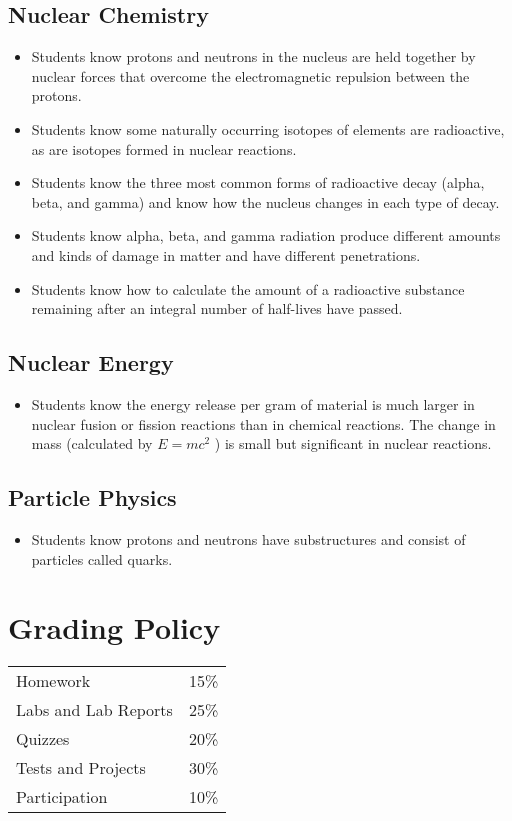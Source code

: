 \documentclass[12pt]{article}
\begin{document}
\subsection{Nuclear Chemistry}

\begin{itemize}
    \item Students know protons and neutrons in the nucleus are held together by nuclear forces that overcome the electromagnetic repulsion between the protons.
    \item Students know some naturally occurring isotopes of elements are radioactive, as are isotopes formed in nuclear reactions.
    \item Students know the three most common forms of radioactive decay (alpha, beta, and gamma) and know how the nucleus changes in each type of decay.
    \item Students know alpha, beta, and gamma radiation produce different amounts and kinds of damage in matter and have different penetrations.
    \item Students know how to calculate the amount of a radioactive substance remaining after an integral number of half-lives have passed.
\end{itemize}

\subsection{Nuclear Energy}

\begin{itemize}
    \item Students know the energy release per gram of material is much larger in nuclear fusion or fission reactions than in chemical reactions. The change in mass (calculated by $E = mc^2$ ) is small but significant in nuclear reactions.
\end{itemize}

\subsection{Particle Physics}

\begin{itemize}
    \item Students know protons and neutrons have substructures and consist of particles called quarks.
\end{itemize}



\section*{Grading Policy}
\begin{tabular}{ll}
Homework & 15\% \\
Labs and Lab Reports & 25\% \\
Quizzes & 20\% \\
Tests and Projects & 30\% \\
Participation & 10\% \\
\end{tabular}
\end{document}
